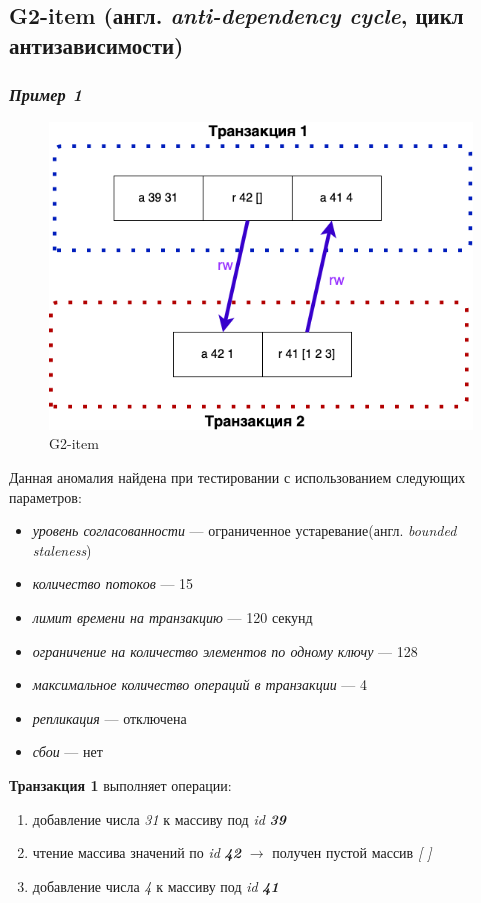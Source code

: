 \documentclass[14pt,  openany]{book}
\begin{document}
\subsection{G2-item (англ. \textit{anti-dependency cycle}, цикл антизависимости)}
\subsubsection{\textit{Пример 1}}
\begin{figure}[H]
  \includegraphics[width=\textwidth]{images/g2item1.png}
  \caption{G2-item}
\end{figure}

\par
Данная аномалия найдена при тестировании с использованием следующих параметров: 
\begin{itemize}
\item[] \textit{уровень согласованности} --- ограниченное устаревание(англ.  \textit{bounded staleness})
\item[] \textit{количество потоков} --- 15
\item[] \textit{лимит времени на транзакцию} --- 120 секунд
\item[] \textit{ограничение на количество элементов по одному ключу} --- 128
\item[] \textit{максимальное количество операций в транзакции} --- 4
\item[] \textit{репликация} --- отключена
\item[] \textit{сбои} --- нет
\end{itemize}

\textbf{Транзакция 1} выполняет операции:
\begin{enumerate}
\item добавление числа \textit{31} к массиву под \textit{id} \textit{\textbf{39}}
\item чтение массива значений по \textit{id} \textit{\textbf{42}} $\rightarrow$ получен пустой массив \textit{[ ]}
\item добавление числа \textit{4} к массиву под \textit{id} \textit{\textbf{41}}
\end{enumerate}
\end{document}
